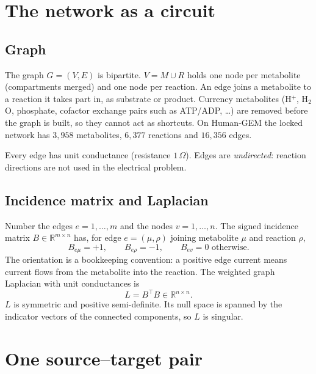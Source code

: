 \documentclass[11pt]{article}
\newcommand{\R}{\mathbb{R}}
\begin{document}
\section{The network as a circuit}

\subsection{Graph}
The graph $G=(V,E)$ is bipartite. $V = M \cup R$ holds one node per metabolite
(compartments merged) and one node per reaction. An edge joins a metabolite to a
reaction it takes part in, as substrate or product. Currency metabolites (H$^+$,
H$_2$O, phosphate, cofactor exchange pairs such as ATP/ADP, \dots) are removed
before the graph is built, so they cannot act as shortcuts. On Human-GEM the locked
network has $3{,}958$ metabolites, $6{,}377$ reactions and $16{,}356$ edges.

Every edge has unit conductance (resistance $1\,\Omega$). Edges are
\emph{undirected}: reaction directions are not used in the electrical problem.

\subsection{Incidence matrix and Laplacian}
Number the edges $e=1,\dots,m$ and the nodes $v=1,\dots,n$. The signed incidence
matrix $B\in\R^{m\times n}$ has, for edge $e=(\mu,\rho)$ joining metabolite $\mu$
and reaction $\rho$,
\[
  B_{e\mu} = +1,\qquad B_{e\rho} = -1,\qquad B_{ev}=0 \text{ otherwise.}
\]
The orientation is a bookkeeping convention: a positive edge current means current
flows from the metabolite into the reaction. The weighted graph Laplacian with unit
conductances is
\[
  L = B^{\top}B \in \R^{n\times n}.
\]
$L$ is symmetric and positive semi-definite. Its null space is spanned by the
indicator vectors of the connected components, so $L$ is singular.

\section{One source--target pair}
\end{document}
